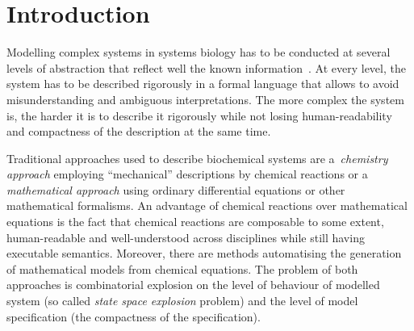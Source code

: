 \documentclass[11pt,a4paper]{report}
\newcounter{counter}[section]
\begin{document}


\pagestyle{plain}

\tableofcontents
\newpage

\setcounter{page}{0}


\chapter{Introduction} \label{chap:intro}

Modelling complex systems in systems biology has to be conducted at several levels of abstraction that reflect well the known information~\cite{Kitano}. At every level, the system has to be described rigorously in a formal language that allows to avoid
misunderstanding and ambiguous interpretations. The more complex the system is, the harder it is to describe it rigorously while not losing human-readability and compactness of the description at the same time.

Traditional approaches used to describe biochemical systems are a~\emph{chemistry approach} employing ``mechanical'' descriptions by chemical reactions or a \emph{mathematical approach} using ordinary differential equations or other mathematical formalisms. An advantage of chemical reactions over mathematical equations is the fact that chemical reactions are composable to some extent, human-readable and well-understood across disciplines while still having executable semantics. 
Moreover, there are methods automatising the generation of mathematical models from chemical equations. The problem of both approaches is combinatorial explosion on the level of behaviour of modelled system (so called \emph{state space explosion} problem) and the level of model specification (the compactness of the specification).
\end{document}
